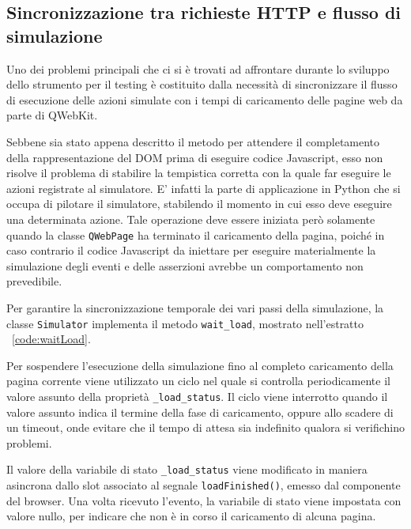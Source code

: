 \subsection{Sincronizzazione tra richieste HTTP e flusso di simulazione}

Uno dei problemi principali che ci si è trovati ad affrontare durante lo sviluppo dello strumento per il testing è costituito dalla necessità di sincronizzare il flusso di esecuzione delle azioni simulate con i tempi di caricamento delle pagine web da parte di QWebKit. 

Sebbene sia stato appena descritto il metodo per attendere il completamento della rappresentazione del DOM prima di eseguire codice Javascript, esso non risolve il problema di stabilire la tempistica corretta con la quale far eseguire le azioni registrate al simulatore. E' infatti la parte di applicazione in Python che si occupa di pilotare il simulatore, stabilendo il momento in cui esso deve eseguire una determinata azione. Tale operazione deve essere iniziata però solamente quando la classe \verb|QWebPage| ha terminato il caricamento della pagina, poiché in caso contrario il codice Javascript da iniettare per eseguire materialmente la simulazione degli eventi e delle asserzioni avrebbe un comportamento non prevedibile. 

Per garantire la sincronizzazione temporale dei vari passi della simulazione, la classe \verb|Simulator| implementa il metodo \verb|wait_load|, mostrato nell'estratto ~\ref{code:waitLoad}.

 

Per sospendere l'esecuzione della simulazione fino al completo caricamento della pagina corrente viene utilizzato un ciclo nel quale si controlla periodicamente il valore assunto della proprietà \verb|_load_status|. Il ciclo viene interrotto quando il valore assunto indica il termine della fase di caricamento, oppure allo scadere di un timeout, onde evitare che il tempo di attesa sia indefinito qualora si verifichino problemi. 

Il valore della variabile di stato \verb|_load_status| viene modificato in maniera asincrona dallo slot associato al segnale \verb|loadFinished()|, emesso dal componente del browser. Una volta ricevuto l'evento, la variabile di stato viene impostata con valore nullo, per indicare che non è in corso il caricamento di alcuna pagina.

